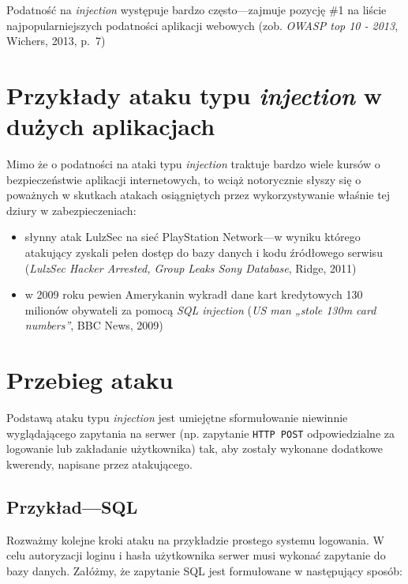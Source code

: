 \documentclass[12pt,polish,a4paper,]{report}
\providecommand{\tightlist}{%
  \setlength{\itemsep}{0pt}\setlength{\parskip}{0pt}}
\begin{document}
Podatność na \emph{injection} występuje bardzo często---zajmuje pozycję
\#1 na liście najpopularniejszych podatności aplikacji webowych (zob.
\emph{OWASP top 10 - 2013}, Wichers, 2013, p.~7)

\section{\texorpdfstring{Przykłady ataku typu \emph{injection} w dużych
aplikacjach}{Przykłady ataku typu injection w dużych aplikacjach}}\label{przykux142ady-ataku-typu-injection-w-duux17cych-aplikacjach}

Mimo że o podatności na ataki typu \emph{injection} traktuje bardzo
wiele kursów o bezpieczeństwie aplikacji internetowych, to wciąż
notorycznie słyszy się o poważnych w skutkach atakach osiągniętych przez
wykorzystywanie właśnie tej dziury w zabezpieczeniach:

\begin{itemize}
\tightlist
\item
  słynny atak LulzSec na sieć PlayStation Network---w wyniku którego
  atakujący zyskali pełen dostęp do bazy danych i kodu źródłowego
  serwisu (\emph{LulzSec Hacker Arrested, Group Leaks Sony Database},
  Ridge, 2011)
\item
  w 2009 roku pewien Amerykanin wykradł dane kart kredytowych 130
  milionów obywateli za pomocą \emph{SQL injection} (\emph{US man „stole
  130m card numbers''}, BBC News, 2009)
\end{itemize}

\section{Przebieg ataku}\label{przebieg-ataku}

Podstawą ataku typu \emph{injection} jest umiejętne sformułowanie
niewinnie wyglądającego zapytania na serwer (np. zapytanie
\texttt{HTTP\ POST} odpowiedzialne za logowanie lub zakładanie
użytkownika) tak, aby zostały wykonane dodatkowe kwerendy, napisane
przez atakującego.

\subsection{Przykład---SQL}\label{przykux142adsql}

Rozważmy kolejne kroki ataku na przykładzie prostego systemu logowania.
W celu autoryzacji loginu i hasła użytkownika serwer musi wykonać
zapytanie do bazy danych. Załóżmy, że zapytanie SQL jest formułowane w
następujący sposób:
\end{document}
